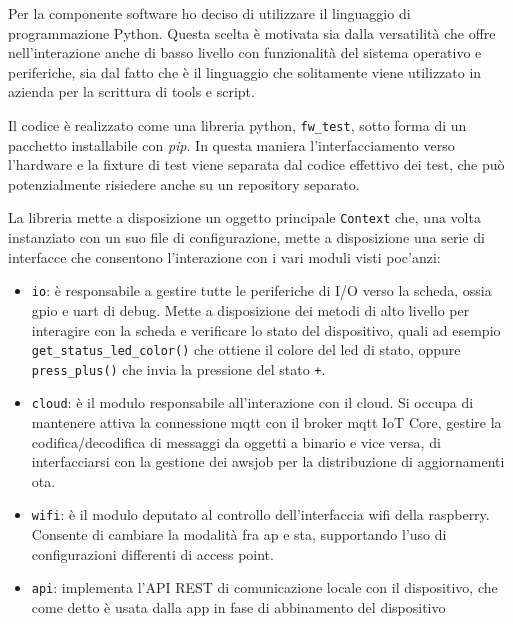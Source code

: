 \documentclass[12pt,a4paper,twoside,titlepage]{book}
\begin{document}
Per la componente software ho deciso di utilizzare il linguaggio di programmazione
Python. Questa scelta è motivata sia dalla versatilità che offre nell'interazione anche
di basso livello con funzionalità del sistema operativo e periferiche, sia dal fatto
che è il linguaggio che solitamente viene utilizzato in azienda per la scrittura di
tools e script.

Il codice è realizzato come una libreria python, \texttt{fw\_test}, sotto forma di
un pacchetto installabile con \textit{pip}. In questa maniera l'interfacciamento
verso l'hardware e la fixture di test viene separata dal codice effettivo dei test,
che può potenzialmente risiedere anche su un repository separato.

La libreria mette a disposizione un oggetto principale \texttt{Context} che, una
volta instanziato con un suo file di configurazione, mette a disposizione una serie
di interfacce che consentono l'interazione con i vari moduli visti poc'anzi:

\begin{itemize}
    \item \texttt{io}: è responsabile a gestire tutte le periferiche di I/O
        verso la scheda, ossia \Gls{gpio} e \Gls{uart} di debug. Mette a disposizione dei metodi di
        alto livello per interagire con la scheda e verificare lo stato del dispositivo,
        quali ad esempio \texttt{get\_status\_led\_color()} che ottiene il colore del
        \acrshort{led} di stato, oppure \texttt{press\_plus()} che invia la pressione del stato \texttt{+}.
    \item \texttt{cloud}: è il modulo responsabile all'interazione con il cloud. Si
        occupa di mantenere attiva la connessione \Gls{mqtt} con il broker \Gls{mqtt} IoT Core,
        gestire la codifica/decodifica di messaggi da oggetti a binario e vice versa,
        di interfacciarsi con la gestione dei \Gls{awsjob} per la distribuzione di aggiornamenti
        \acrshort{ota}.
    \item \texttt{wifi}: è il modulo deputato al controllo dell'interfaccia \Gls{wifi}
        della raspberry. Consente di cambiare la modalità fra \acrshort{ap} e \acrshort{sta},
        supportando l'uso di configurazioni differenti di access point.
    \item \texttt{api}: implementa l'API REST di comunicazione locale con il dispositivo,
        che come detto è usata dalla app in fase di abbinamento del dispositivo
\end{itemize}
\end{document}

